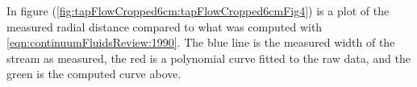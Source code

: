 \begin{Answer}[ref={problem:fluids:review:q2}]
In figure (\ref{fig:tapFlowCropped6cm:tapFlowCropped6cmFig4}) is a plot of the measured radial distance compared to what was computed with \ref{eqn:continuumFluidsReview:1990}.  The blue line is the measured width of the stream as measured, the red is a polynomial curve fitted to the raw data, and the green is the computed curve above.

\end{Answer}


